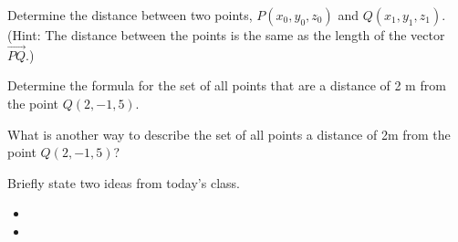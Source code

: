 \begin{problem}
\clearpage

\item Determine the distance between two points, $P(x_0,y_0,z_0)$ and $Q(x_1,y_1,z_1)$.
   (Hint: The distance between the points is the same as the length of the vector $\vec{PQ}$.)

   \vfill

 \item Determine the formula for the set of all points that are a distance of 2 m from the point $Q(2,-1,5)$.

  \vfill

  \item What is another way to describe the set of all points a distance of 2m from the point  $Q(2,-1,5)$?

\end{problem}


\postClass

\begin{problem}
\item Briefly state two ideas from today's class.
  \begin{itemize}
  \item
  \item
  \end{itemize}
\item
  \begin{subproblem}
    \item
  \end{subproblem}
\end{problem}



